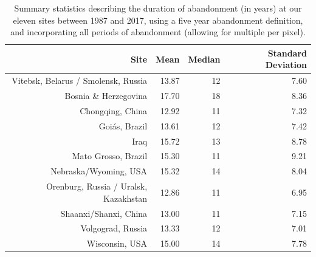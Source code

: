 \documentclass[
]{article}
\begin{document}
\begin{table}[!h]

\caption{\label{tab:summary-stats-table}Summary statistics describing the duration of abandonment (in years) at our eleven sites between 1987 and 2017, using a five year abandonment definition, and incorporating all periods of abandonment (allowing for multiple per pixel).}
\centering
\begin{tabular}[t]{rrrr}
\toprule
Site & Mean & Median & Standard Deviation\\
\midrule
Vitebsk, Belarus / Smolensk, Russia & 13.87 & 12 & 7.60\\
Bosnia \& Herzegovina & 17.70 & 18 & 8.36\\
Chongqing, China & 12.92 & 11 & 7.32\\
Goiás, Brazil & 13.61 & 12 & 7.42\\
Iraq & 15.72 & 13 & 8.78\\
\addlinespace
Mato Grosso, Brazil & 15.30 & 11 & 9.21\\
Nebraska/Wyoming, USA & 15.32 & 14 & 8.04\\
Orenburg, Russia / Uralsk, Kazakhstan & 12.86 & 11 & 6.95\\
Shaanxi/Shanxi, China & 13.00 & 11 & 7.15\\
Volgograd, Russia & 13.33 & 12 & 7.01\\
\addlinespace
Wisconsin, USA & 15.00 & 14 & 7.78\\
\bottomrule
\end{tabular}
\end{table}
\end{document}
